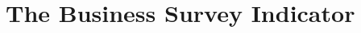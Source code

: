 \documentclass[12pt,a4paper,oneside]{book}
\begin{document}








\chapter{The Business Survey Indicator}
\end{document}
